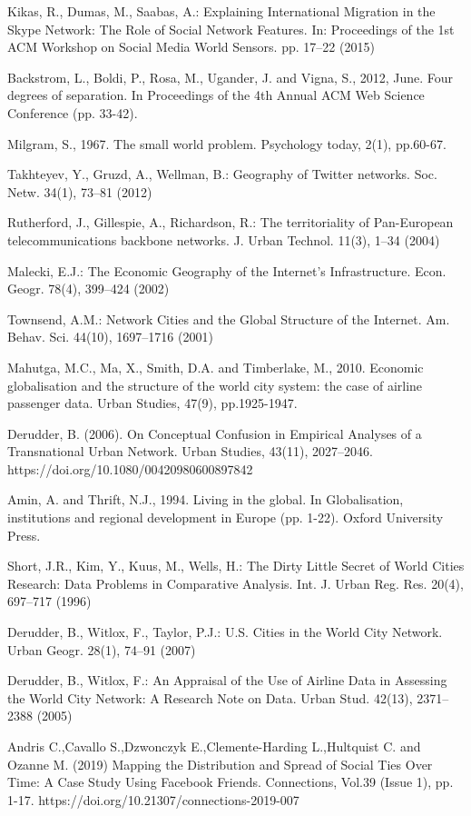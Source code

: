 \documentclass[12pt]{article}
\begin{document}
Kikas, R., Dumas, M., Saabas, A.: Explaining International Migration in the Skype
Network: The Role of Social Network Features. In: Proceedings of the 1st ACM
Workshop on Social Media World Sensors. pp. 17–22 (2015)

Backstrom, L., Boldi, P., Rosa, M., Ugander, J. and Vigna, S., 2012, June. Four degrees of separation. In Proceedings of the 4th Annual ACM Web Science Conference (pp. 33-42).

Milgram, S., 1967. The small world problem. Psychology today, 2(1), pp.60-67.

Takhteyev, Y., Gruzd, A., Wellman, B.: Geography of Twitter networks. Soc. Netw.
34(1), 73–81 (2012)

Rutherford, J., Gillespie, A., Richardson, R.: The territoriality of Pan-European
telecommunications backbone networks. J. Urban Technol. 11(3), 1–34 (2004)

Malecki, E.J.: The Economic Geography of the Internet’s Infrastructure. Econ.
Geogr. 78(4), 399–424 (2002)

Townsend, A.M.: Network Cities and the Global Structure of the Internet. Am.
Behav. Sci. 44(10), 1697–1716 (2001)

Mahutga, M.C., Ma, X., Smith, D.A. and Timberlake, M., 2010. Economic globalisation and the structure of the world city system: the case of airline passenger data. Urban Studies, 47(9), pp.1925-1947.

Derudder, B. (2006). On Conceptual Confusion in Empirical Analyses of a Transnational Urban Network. Urban Studies, 43(11), 2027–2046. https://doi.org/10.1080/00420980600897842

Amin, A. and Thrift, N.J., 1994. Living in the global. In Globalisation, institutions and regional development in Europe (pp. 1-22). Oxford University Press.

Short, J.R., Kim, Y., Kuus, M., Wells, H.: The Dirty Little Secret of World Cities
Research: Data Problems in Comparative Analysis. Int. J. Urban Reg. Res. 20(4),
697–717 (1996)

Derudder, B., Witlox, F., Taylor, P.J.: U.S. Cities in the World City Network.
Urban Geogr. 28(1), 74–91 (2007)

Derudder, B., Witlox, F.: An Appraisal of the Use of Airline Data in Assessing the
World City Network: A Research Note on Data. Urban Stud. 42(13), 2371–2388
(2005)

Andris C.,Cavallo S.,Dzwonczyk E.,Clemente-Harding L.,Hultquist C. and Ozanne M. (2019) Mapping the Distribution and Spread of Social Ties Over Time: A Case Study Using Facebook Friends. Connections, Vol.39 (Issue 1), pp. 1-17. https://doi.org/10.21307/connections-2019-007
\end{document}
